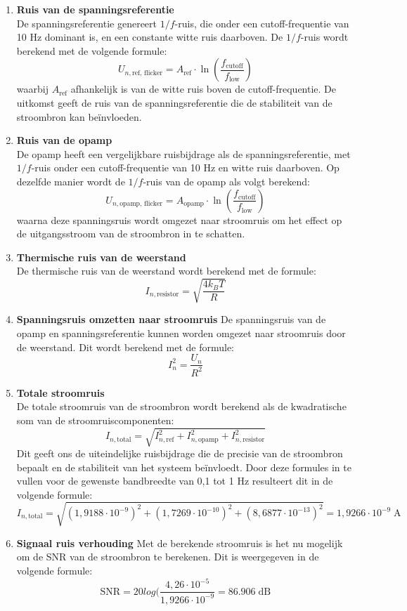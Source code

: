 \begin{enumerate}
    \item \textbf{Ruis van de spanningsreferentie} \\
    De spanningsreferentie genereert \(1/f\)-ruis, die onder een cutoff-frequentie van 10 Hz dominant is, en een constante witte ruis daarboven. De \(1/f\)-ruis wordt berekend met de volgende formule:
    \[
    U_{n,\text{ref, flicker}} = A_{\text{ref}} \cdot \ln\left(\frac{f_{\text{cutoff}}}{f_{\text{low}}}\right)
    \]
    waarbij \(A_{\text{ref}}\) afhankelijk is van de witte ruis boven de cutoff-frequentie. De uitkomst geeft de ruis van de spanningsreferentie die de stabiliteit van de stroombron kan beïnvloeden.

    \item \textbf{Ruis van de opamp} \\
    De opamp heeft een vergelijkbare ruisbijdrage als de spanningsreferentie, met \(1/f\)-ruis onder een cutoff-frequentie van 10 Hz en witte ruis daarboven. Op dezelfde manier wordt de \(1/f\)-ruis van de opamp als volgt berekend:
    \[
    U_{n,\text{opamp, flicker}} = A_{\text{opamp}} \cdot \ln\left(\frac{f_{\text{cutoff}}}{f_{\text{low}}}\right)
    \]
    waarna deze spanningsruis wordt omgezet naar stroomruis om het effect op de uitgangsstroom van de stroombron in te schatten.

    \item \textbf{Thermische ruis van de weerstand} \\
    De thermische ruis van de weerstand wordt berekend met de formule:
    \[
    I_{n,\text{resistor}} = \sqrt{\frac{4 k_B T}{R}}
    \]

    \item \textbf{Spanningsruis omzetten naar stroomruis}
    De spanningsruis van de opamp en spanningsreferentie kunnen worden omgezet naar stroomruis door de weerstand. Dit wordt berekend met de formule:
    \[
    I_{n}^2 = \frac{U_{n}}{R^2}
    \]

    \item \textbf{Totale stroomruis} \\
    De totale stroomruis van de stroombron wordt berekend als de kwadratische som van de stroomruiscomponenten:
    \[
    I_{n,\text{total}} = \sqrt{I_{n,\text{ref}}^2 + I_{n,\text{opamp}}^2 + I_{n,\text{resistor}}^2}
    \]
    Dit geeft ons de uiteindelijke ruisbijdrage die de precisie van de stroombron bepaalt en de stabiliteit van het systeem beïnvloedt. Door deze formules in te vullen voor de gewenste bandbreedte van 0,1 tot 1 Hz resulteert dit in de volgende formule:
    \[
    I_{n,\text{total}} = \sqrt{(1,9188 \cdot 10^{-9})^2 + (1,7269 \cdot 10^{-10})^2 + (8,6877 \cdot 10^{-13})^2} = 1,9266 \cdot 10^{-9}\; \text{A}
    \]

    \item \textbf{Signaal ruis verhouding}
    Met de berekende stroomruis is het nu mogelijk om de SNR van de stroombron te berekenen. Dit is weergegeven in de volgende formule:
    \[
    \text{SNR} = 20log(\frac{4,26 \cdot 10^{-5}}{1,9266 \cdot 10^{-9}} = 86.906\; \text{dB}
    \]
\end{enumerate}

